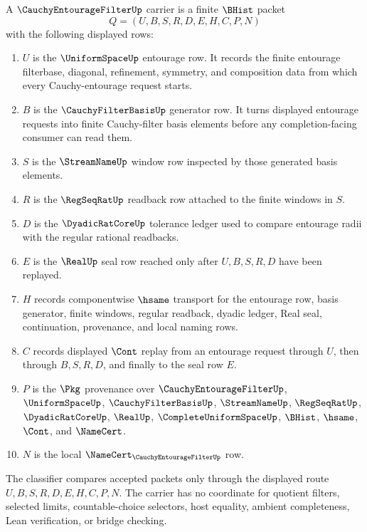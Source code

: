 \begin{definition}
\label{def:cauchy-entourage-filter-carrier}
A $\CauchyEntourageFilterUp$ carrier is a finite $\BHist$ packet
$$
Q=(U,B,S,R,D,E,H,C,P,N)
$$
with the following displayed rows:
\begin{enumerate}
\item $U$ is the $\UniformSpaceUp$ entourage row. It records the finite entourage filterbase, diagonal, refinement, symmetry, and composition data from which every Cauchy-entourage request starts.
\item $B$ is the $\CauchyFilterBasisUp$ generator row. It turns displayed entourage requests into finite Cauchy-filter basis elements before any completion-facing consumer can read them.
\item $S$ is the $\StreamNameUp$ window row inspected by those generated basis elements.
\item $R$ is the $\RegSeqRatUp$ readback row attached to the finite windows in $S$.
\item $D$ is the $\DyadicRatCoreUp$ tolerance ledger used to compare entourage radii with the regular rational readbacks.
\item $E$ is the $\RealUp$ seal row reached only after $U,B,S,R,D$ have been replayed.
\item $H$ records componentwise $\hsame$ transport for the entourage row, basis generator, finite windows, regular readback, dyadic ledger, Real seal, continuation, provenance, and local naming rows.
\item $C$ records displayed $\Cont$ replay from an entourage request through $U$, then through $B,S,R,D$, and finally to the seal row $E$.
\item $P$ is the $\Pkg$ provenance over $\CauchyEntourageFilterUp$, $\UniformSpaceUp$, $\CauchyFilterBasisUp$, $\StreamNameUp$, $\RegSeqRatUp$, $\DyadicRatCoreUp$, $\RealUp$, $\CompleteUniformSpaceUp$, $\BHist$, $\hsame$, $\Cont$, and $\NameCert$.
\item $N$ is the local $\NameCert_{\CauchyEntourageFilterUp}$ row.
\end{enumerate}
The classifier compares accepted packets only through the displayed route $U,B,S,R,D,E,H,C,P,N$. The carrier has no coordinate for quotient filters, selected limits, countable-choice selectors, host equality, ambient completeness, Lean verification, or bridge checking.
\end{definition}

